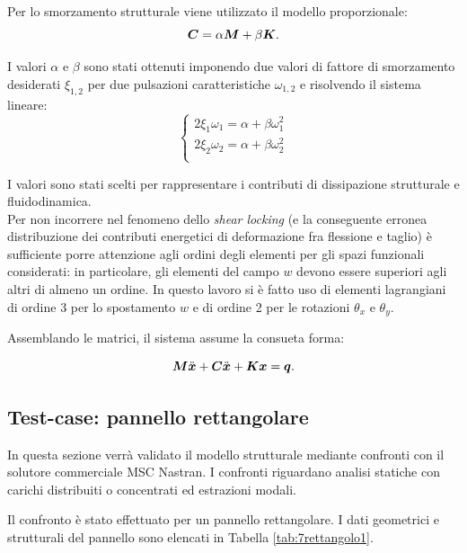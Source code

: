 Per lo smorzamento strutturale viene utilizzato il modello proporzionale:
\begin{equation}
\label{eq:7plv11}
\boldsymbol{C} = \alpha \boldsymbol{M}+\beta\boldsymbol{K}.
\end{equation}

I valori $\alpha$ e $\beta$ sono stati ottenuti imponendo due valori di fattore di smorzamento desiderati $\xi_{1,2}$ per due pulsazioni caratteristiche $\omega_{1,2}$ e risolvendo il sistema lineare:
\begin{equation}
\label{eq:7plv12}
\left\{
\begin{array}{c}
2\xi_1\omega_1 = \alpha+\beta\omega_1^2\\
2\xi_2\omega_2 = \alpha+\beta\omega_2^2\\
\end{array}\right.
\end{equation}

I valori sono stati scelti per rappresentare i contributi di dissipazione strutturale e fluidodinamica.\\

Per non incorrere nel fenomeno dello \textit{shear locking} (e la conseguente erronea distribuzione dei contributi energetici di deformazione fra flessione e taglio) è sufficiente porre attenzione agli ordini degli elementi per gli spazi funzionali considerati: in particolare, gli elementi del campo $w$ devono essere superiori agli altri di almeno un ordine. In questo lavoro si è fatto uso di elementi lagrangiani di ordine 3 per lo spostamento $w$ e di ordine 2 per le rotazioni $\theta_x$ e $\theta_y$.

Assemblando le matrici, il sistema assume la consueta forma:

\begin{equation}
\label{eq:7plv13}
\boldsymbol{M}\ddot{\boldsymbol{x}}+\boldsymbol{C}\ddot{\boldsymbol{x}}+\boldsymbol{K}\boldsymbol{x} = \boldsymbol{q}.
\end{equation}
\subsection{Test-case: pannello rettangolare}

In questa sezione verrà validato il modello strutturale mediante confronti con il solutore commerciale MSC Nastran. I confronti riguardano analisi statiche con carichi distribuiti o concentrati ed estrazioni modali. 

Il confronto è stato effettuato per un pannello rettangolare. I dati geometrici e strutturali del pannello sono elencati in Tabella \ref{tab:7rettangolo1}.\\

